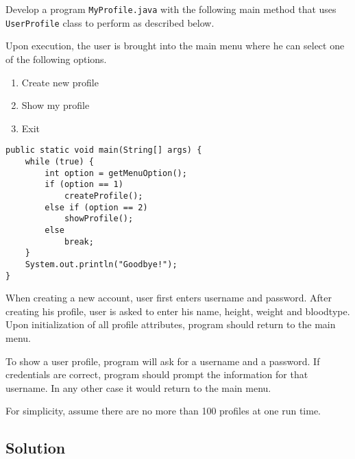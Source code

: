 Develop a program \texttt{MyProfile.java} with the following main method that uses \texttt{UserProfile} class to perform as described below.

Upon execution, the user is brought into the main menu where he can select one of the following options.
\begin{enumerate}[itemsep=0pt]
\parskip=0pt \parsep=0pt
\item Create new profile
\item Show my profile
\item Exit
\end{enumerate}

\lstset{language=java}
\begin{lstlisting}
public static void main(String[] args) {
	while (true) {
		int option = getMenuOption();
		if (option == 1)
			createProfile();
		else if (option == 2)
			showProfile();
		else
			break;
	}
	System.out.println("Goodbye!");
}
\end{lstlisting}

When creating a new account, user first enters username and password. After creating his profile, user is asked to enter his name, height, weight and bloodtype. Upon initialization of all profile attributes, program should return to the main menu.

To show a user profile, program will ask for a username and a password. If credentials are correct, program should prompt the information for that username. In any other case it would return to the main menu.

For simplicity, assume there are no more than 100 profiles at one run time.

\subsection*{Solution}

